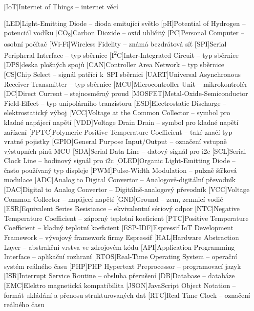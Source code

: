\cleardoublepage
\chapter*{\listofabbrevname}
{}

\begin{acronym}[iotasdasdsd]

	[IoT]{Internet of Things -- internet věcí}

	[LED]{Light-Emitting Diode -- dioda emitující světlo}
	[pH]{Potential of Hydrogen -- potenciál vodíku}
	[CO\textsubscript{2}]{Carbon Dioxide -- oxid uhličitý}
	[PC]{Personal Computer -- osobní počítač}
	[Wi-Fi]{Wireless Fidelity -- známá bezdrátová síť}
	[SPI]{Serial Peripheral Interface -- typ sběrnice}
	[I\textsuperscript{2}C]{Inter-Integrated Circuit -- typ sběrnice}
	[DPS]{deska plošných spojů}
	[CAN]{Controller Area Network -- typ sběrnice}
	[CS]{Chip Select -- signál patřící k~SPI sběrnici}
	[UART]{Universal Asynchronous Receiver-Transmitter -- typ sběrnice}
	[MCU]{Microcontroller Unit -- mikrokontrolér}
	[DC]{Direct Current -- stejnosměrný proud}
	[MOSFET]{Metal-Oxide-Semiconductor Field-Effect -- typ unipolárního tranzistoru}
	[ESD]{Electrostatic Discharge -- elektrostatický výboj}
	[VCC]{Voltage at the Common Collector -- symbol pro kladné napájecí napětí}
	[VDD]{Voltage Drain Drain -- symbol pro kladné napětí zařízení}
	[PPTC]{Polymeric Positive Temperature Coefficient -- také značí typ vratné pojistky}
	[GPIO]{General Purpose Input/Output -- označení vstupně výstupních pinů MCU}
	[SDA]{Serial Data Line -- datový signál pro \acs{i2c}}
	[SCL]{Serial Clock Line -- hodinový signál pro \acs{i2c}}
	[OLED]{Organic Light-Emitting Diode -- často používaný typ displeje}
	[PWM]{Pulse-Width Modulation -- pulzně šířková modulace}
	[ADC]{Analog to Digital Convertor -- Analogově-digitální převodník}
	[DAC]{Digital to Analog Convertor -- Digitálně-analogový převodník}
	[VCC]{Voltage Common Collector -- napájecí napětí}
	[GND]{Ground -- zem, zemnicí vodič}
	[ESR]{Equivalent Series Resistance -- ekvivalentní sériový odpor}
	[NTC]{Negative Temperature Coefficient -- záporný teplotní koeficient}
	[PTC]{Positive Temperature Coefficient -- kladný teplotní koeficient}
	[ESP-IDF]{Espressif IoT Development Framework -- vývojový framework firmy Espressif}
	[HAL]{Hardware Abstraction Layer -- abstrakční vrstva ve zdrojovém kódu}
	[API]{Application Programming Interface -- aplikační rozhraní}
	[RTOS]{Real-Time Operating System -- operační systém reálného času}
	[PHP]{PHP Hypertext Preprocessor -- programovací jazyk}
	[ISR]{Interrupt Service Routine -- obsluha přerušení}
	[DB]{Database -- databáze}
	[EMC]{Elektro magnetická kompatibilita}
	[JSON]{JavaScript Object Notation -- formát ukládání a přenosu strukturovaných dat}
	[RTC]{Real Time Clock -- označení reálného času}

\end{acronym}
